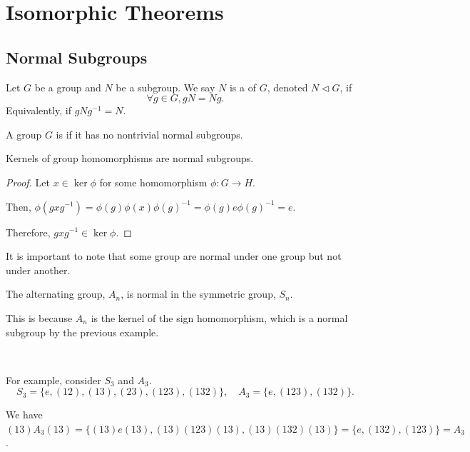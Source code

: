 \chapter{Isomorphic Theorems}

\section{Normal Subgroups}

\begin{definition}\label{def:normal-subgroup}
    Let $G$ be a group and $N$ be a subgroup. We say $N$ is a  of $G$, denoted $N \triangleleft G$, if \[
        \forall g \in G, gN = Ng.
    \] Equivalently, if $gNg^{-1} = N$. 
\end{definition}

\begin{definition}\label{def:simple-group}
    A group $G$ is  if it has no nontrivial normal subgroups.
\end{definition}

\begin{example}
    Kernels of group homomorphisms are normal subgroups.

    \begin{proof}
        Let $x \in \ker{\phi}$ for some homomorphism $\phi: G \to H$. 
        
        Then, $\phi(gxg^{-1}) = \phi(g)\phi(x)\phi(g)^{-1} = \phi(g)e\phi(g)^{-1} = e$.
        
        Therefore, $gxg^{-1} \in \ker{\phi}$.
    \end{proof}
\end{example}

It is important to note that some group are normal under one group but not under another.

\begin{example}
    The alternating group, $A_n$, is normal in the symmetric group, $S_n$.

    This is because $A_n$ is the kernel of the sign homomorphism, which is a normal subgroup by the previous example.

    {~~~}

    For example, consider $S_3$ and $A_3$. \[
        S_3 = \{e, (12), (13), (23), (123), (132)\}, \quad A_3 = \{e, (123), (132)\}.
    \]

    We have $(13)A_3(13) = \{
        (13)e(13), (13)(123)(13), (13)(132)(13)
    \} = \{ 
        e, (132), (123) 
    \} = A_3$.
\end{example}

